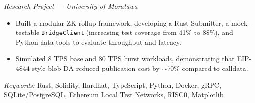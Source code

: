 \noindent 
{} 
 
\noindent 
\textit{Research Project — University of Moratuwa} 
 
\begin{itemize} 
    \item Built a modular ZK-rollup framework, developing a Rust Submitter, a mock-testable \texttt{BridgeClient} (increasing test coverage from 41\% to 88\%), and Python data tools to evaluate throughput and latency.
 
    \item Simulated 8 TPS base and 80 TPS burst workloads, demonstrating that EIP-4844-style blob DA reduced publication cost by $\sim$70\% compared to calldata.
\end{itemize} 
 
\noindent 
\textit{Keywords:} Rust, Solidity, Hardhat, TypeScript, Python, Docker, gRPC, SQLite/PostgreSQL, Ethereum Local Test Networks, RISC0, Matplotlib
